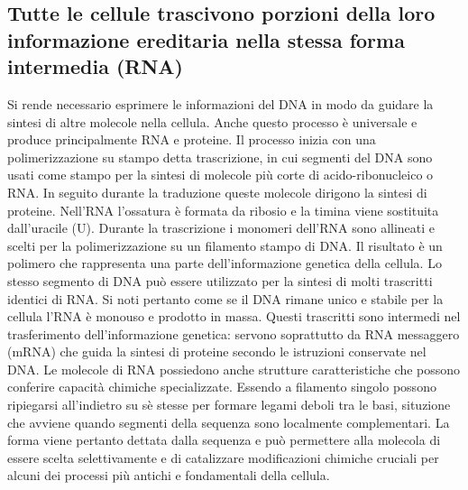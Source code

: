 \subsection{Tutte le cellule trascivono porzioni della loro informazione ereditaria nella stessa forma intermedia (RNA)}
Si rende necessario esprimere le informazioni del DNA in modo da guidare la sintesi di altre molecole nella cellula. Anche questo processo \`e universale e 
produce principalmente RNA e proteine. Il processo inizia con una polimerizzazione su stampo detta trascrizione, in cui segmenti del DNA sono usati come
stampo per la sintesi di molecole pi\`u corte di acido-ribonucleico o RNA. In seguito durante la traduzione queste molecole dirigono la sintesi di proteine.
Nell'RNA l'ossatura \`e formata da ribosio e la timina viene sostituita dall'uracile (U). Durante la trascrizione i monomeri dell'RNA sono allineati e 
scelti per la polimerizzazione su un filamento stampo di DNA. Il risultato \`e un polimero che rappresenta una parte dell'informazione genetica della 
cellula. Lo stesso segmento di DNA pu\`o essere utilizzato per la sintesi di molti trascritti identici di RNA. Si noti pertanto come se il DNA rimane unico 
e stabile per la cellula l'RNA \`e monouso e prodotto in massa. Questi trascritti sono intermedi nel trasferimento dell'informazione genetica: servono 
soprattutto da RNA messaggero (mRNA) che guida la sintesi di proteine secondo le istruzioni conservate nel DNA. Le molecole di RNA possiedono anche 
strutture caratteristiche che possono conferire capacit\`a chimiche specializzate. Essendo a filamento singolo possono ripiegarsi all'indietro su s\`e 
stesse per formare legami deboli tra le basi, situzione che avviene quando segmenti della sequenza sono localmente complementari. La forma viene pertanto 
dettata dalla sequenza e pu\`o permettere alla molecola di essere scelta selettivamente e di catalizzare modificazioni chimiche cruciali per alcuni dei 
processi pi\`u antichi e fondamentali della cellula.
